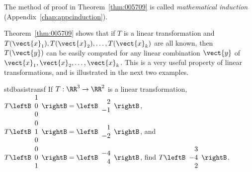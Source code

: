 \noindent The method of proof in Theorem~\ref{thm:005709} is called \textit{mathematical induction} (Appendix~\ref{chap:appcinduction}).

Theorem~\ref{thm:005709} shows that if $T$ is a linear transformation and $T(\vect{x}_{1}), T(\vect{x}_{2}), \dots, T(\vect{x}_{k})$ are all known, then $T(\vect{y})$ can be easily computed for any linear combination $\vect{y}$ of $\vect{x}_{1}, \vect{x}_{2}, \dots, \vect{x}_{k}$. This is a very useful property of linear transformations, and is illustrated in the next two examples.

\begin{example}{}{stdbasistransf}
If $T : \RR^{3} \to \RR^{2}$ is a linear transformation, $T \leftB \begin{array}{r}
1 \\
0 \\
0
\end{array} \rightB = \leftB \begin{array}{r}
2 \\
-1
\end{array} \rightB$, 
 $T \leftB \begin{array}{r}
 0 \\
  1\\
  0
 \end{array} \rightB = \leftB \begin{array}{r}
 1 \\
 -2
 \end{array} \rightB$, and 
 $T \leftB \begin{array}{r}
 0 \\
 0\\
 1
 \end{array} \rightB = \leftB \begin{array}{r}
 -4 \\
 4
 \end{array} \rightB$,   find $T \leftB \begin{array}{r}
 3 \\
 -4 \\
 2
 \end{array} \rightB$.


\end{example}
